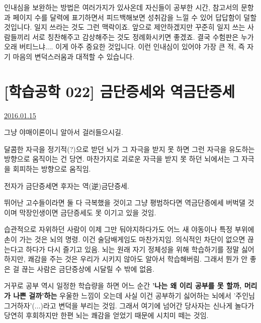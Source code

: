 인내심을 보완하는 방법은 여러가지가 있사온데
자신들이 공부한 시간, 참고서의 문항과 페이지 수를 달력에 표기하면서 피드백해보면 성취감을 느낄 수 있어 답답함이 덜할 것입니다.
일지 쓰라는 것도 그런 맥락이죠. 앞으로 제안하겠지만 꾸준히 일지 쓰는 사람들끼리 서로 칭찬해주고 감상해주는 것도 정례화시키면 좋겠죠.
결국 수험판은 누가 오래 버티느냐.... 이게 아주 중요한 것입니다.
이런 인내심이 있어야 가장 큰 적, 즉 자기 마음의 변덕스러움과 대적할 수 있습니다.
\vspace{5mm}


\section{[학습공학 022] 금단증세와 역금단증세}
\href{https://www.kockoc.com/Apoc/589069}{2016.01.15}

\vspace{5mm}

그냥 야매이론이니 알아서 걸러들으시길.
\vspace{5mm}

달콤한 자극을 정기적(?)으로 받던 뇌가 그 자극을 받지 못 하면
그런 자극을 유도하는 방향으로 움직이는 건 당연.
마찬가지로 괴로운 자극을 받지 못 하던 뇌에서는
그 자극을 회피하는 방향으로 움직임.
\vspace{5mm}

전자가 금단증세면 후자는 역(逆)금단증세.
\vspace{5mm}

뛰어난 고수들이라면 둘 다 극복했을 것이고
그냥 평범하다면 역금단증에세 버벅댈 것이며
막장인생이면 금단증세도 못 이기고 있을 것임.
\vspace{5mm}

습관적으로 자위하던 사람이 이제 그만 둬야지하다가도 어느 새 야동이나 특정 부위에 손이 가는 것은 뇌의 명령.
이건 술담배게임도 마찬가지임. 의식적인 차단이 없으면 끊는다고 하다가 다시 즐기고 있음.
뇌는 원래 자기 정체성을 위해 학습하기를 정말 싫어하지만, 쾌감을 주는 것은 우리가 시키지 않아도 알아서 학습해버림.
그래서 뭔가 안 좋은 걸 끊는 사람은 금단증상에 시달릴 수 밖에 없음.
\vspace{5mm}

거꾸로 공부 역시 일정한 학습량을 하면 어느 순간 \textbf{'나는 왜 이리 공부를 못 할까, 머리가 나쁜 걸까'하는} 우울한 느낌이 오는데
사실 이건 공부하기 싫어하는 뇌에서 '주인님 그거하자'(...)라고 변덕을 부리는 것임.
그래서 여기에 넘어간 당사자는 신나게 놀다가 당연히 후회하지만 한편 뇌는 쾌감을 얻었기 때문에 시치미 떼는 것임.
\vspace{5mm}

